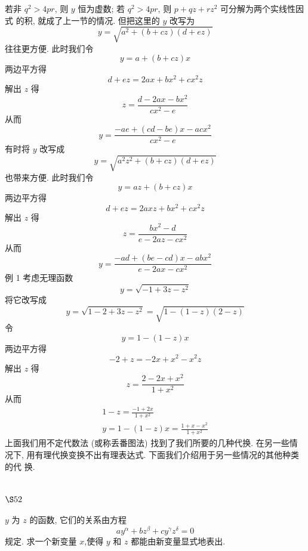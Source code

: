若非 $q^{2}>4 p r$, 则 $y$ 恒为虚数; 若 $q^{2}>4 p r$, 则 $p+q z+r z^{2}$ 可分解为两个实线性因式 的积, 就成了上一节的情况. 但把这里的 $y$ 改写为
\[
y=\sqrt{a^{2}+(b+c z)(d+e z)}
\]
往往更方便. 此时我们令
\[
y=a+(b+c z) x
\]
两边平方得
\[
d+e z=2 a x+b x^{2}+c x^{2} z
\]
解出 $z$ 得
\[
z=\frac{d-2 a x-b x^{2}}{c x^{2}-e}
\]
从而
\[
y=\frac{-a e+(c d-b e) x-a c x^{2}}{c x^{2}-e}
\]
有时将 $y$ 改写成
\[
y=\sqrt{a^{2} z^{2}+(b+c z)(d+e z)}
\]
也带来方便. 此时我们令
\[
y=a z+(b+c z) x
\]
两边平方得
\[
d+e z=2 a x z+b x^{2}+c x^{2} z
\]
解出 $z$ 得
\[
z=\frac{b x^{2}-d}{e-2 a z-c x^{2}}
\]
从而
\[
y=\frac{-a d+(b e-c d) x-a b x^{2}}{e-2 a x-c x^{2}}
\]
例 1 考虑无理函数
\[
y=\sqrt{-1+3 z-z^{2}}
\]
将它改写成
\[
y=\sqrt{1-2+3 z-z^{2}}=\sqrt{1-(1-z)(2-z)}
\]
令
\[
y=1-(1-z) x
\]
两边平方得
\[
-2+z=-2 x+x^{2}-x^{2} z
\]
解出 $z$ 得
\[
z=\frac{2-2 x+x^{2}}{1+x^{2}}
\]
从而
\[
\begin{gathered}
1-z=\frac{-1+2 x}{1+x^{2}} \\
y=1-(1-z) x=\frac{1+x-x^{2}}{1+x^{2}}
\end{gathered}
\]
上面我们用不定代数法 (或称丢番图法) 找到了我们所要的几种代换. 在另一些情 况下, 用有理代换变换不出有理表达式. 下面我们介绍用于另一些情况的其他种类的代 换.

\section{$\S 52$}

$y$ 为 $z$ 的函数, 它们的关系由方程
\[
a y^{\alpha}+b z^{\beta}+c y^{\gamma} z^{\delta}=0
\]
规定. 求一个新变量 $x$,使得 $y$ 和 $z$ 都能由新变量显式地表出. 


